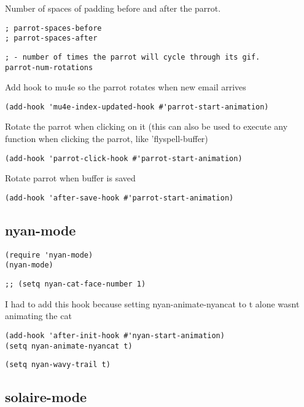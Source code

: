 \documentclass[11pt]{article}
\begin{document}
Number of spaces of padding before and after the parrot.
\begin{verbatim}
; parrot-spaces-before 
; parrot-spaces-after
\end{verbatim}

\begin{verbatim}
; - number of times the parrot will cycle through its gif.
parrot-num-rotations 
\end{verbatim}


Add hook to mu4e so the parrot rotates when new email arrives
\begin{verbatim}
(add-hook 'mu4e-index-updated-hook #'parrot-start-animation)
\end{verbatim}

Rotate the parrot when clicking on it (this can also be used to execute any function when clicking the parrot, like 'flyspell-buffer)
\begin{verbatim}
(add-hook 'parrot-click-hook #'parrot-start-animation)
\end{verbatim}

Rotate parrot when buffer is saved
\begin{verbatim}
(add-hook 'after-save-hook #'parrot-start-animation)
\end{verbatim}

\subsection*{nyan-mode}
\label{sec:orgd229a16}

\begin{verbatim}
(require 'nyan-mode)
(nyan-mode)
\end{verbatim}

\begin{verbatim}
;; (setq nyan-cat-face-number 1)
\end{verbatim}

I had to add this hook because setting nyan-animate-nyancat to t alone wasnt animating the cat
\begin{verbatim}
(add-hook 'after-init-hook #'nyan-start-animation)
(setq nyan-animate-nyancat t)
\end{verbatim}

\begin{verbatim}
(setq nyan-wavy-trail t)
\end{verbatim}

\subsection*{solaire-mode}
\label{sec:org2cc4e4e}
\end{document}
